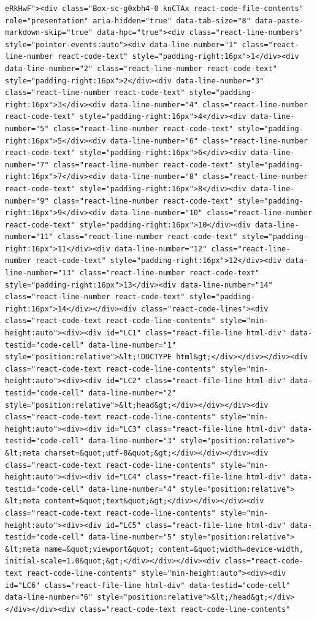 \documentclass[
  letterpaper,
]{book}
\begin{document}
\begin{verbatim}
eRkHwF"><div class="Box-sc-g0xbh4-0 knCTAx react-code-file-contents" role="presentation" aria-hidden="true" data-tab-size="8" data-paste-markdown-skip="true" data-hpc="true"><div class="react-line-numbers" style="pointer-events:auto"><div data-line-number="1" class="react-line-number react-code-text" style="padding-right:16px">1</div><div data-line-number="2" class="react-line-number react-code-text" style="padding-right:16px">2</div><div data-line-number="3" class="react-line-number react-code-text" style="padding-right:16px">3</div><div data-line-number="4" class="react-line-number react-code-text" style="padding-right:16px">4</div><div data-line-number="5" class="react-line-number react-code-text" style="padding-right:16px">5</div><div data-line-number="6" class="react-line-number react-code-text" style="padding-right:16px">6</div><div data-line-number="7" class="react-line-number react-code-text" style="padding-right:16px">7</div><div data-line-number="8" class="react-line-number react-code-text" style="padding-right:16px">8</div><div data-line-number="9" class="react-line-number react-code-text" style="padding-right:16px">9</div><div data-line-number="10" class="react-line-number react-code-text" style="padding-right:16px">10</div><div data-line-number="11" class="react-line-number react-code-text" style="padding-right:16px">11</div><div data-line-number="12" class="react-line-number react-code-text" style="padding-right:16px">12</div><div data-line-number="13" class="react-line-number react-code-text" style="padding-right:16px">13</div><div data-line-number="14" class="react-line-number react-code-text" style="padding-right:16px">14</div></div><div class="react-code-lines"><div class="react-code-text react-code-line-contents" style="min-height:auto"><div><div id="LC1" class="react-file-line html-div" data-testid="code-cell" data-line-number="1" style="position:relative">&lt;!DOCTYPE html&gt;</div></div></div><div class="react-code-text react-code-line-contents" style="min-height:auto"><div><div id="LC2" class="react-file-line html-div" data-testid="code-cell" data-line-number="2" style="position:relative">&lt;head&gt;</div></div></div><div class="react-code-text react-code-line-contents" style="min-height:auto"><div><div id="LC3" class="react-file-line html-div" data-testid="code-cell" data-line-number="3" style="position:relative">    &lt;meta charset=&quot;utf-8&quot;&gt;</div></div></div><div class="react-code-text react-code-line-contents" style="min-height:auto"><div><div id="LC4" class="react-file-line html-div" data-testid="code-cell" data-line-number="4" style="position:relative">    &lt;meta content=&quot;text&quot;&gt;</div></div></div><div class="react-code-text react-code-line-contents" style="min-height:auto"><div><div id="LC5" class="react-file-line html-div" data-testid="code-cell" data-line-number="5" style="position:relative">    &lt;meta name=&quot;viewport&quot; content=&quot;width=device-width, initial-scale=1.0&quot;&gt;</div></div></div><div class="react-code-text react-code-line-contents" style="min-height:auto"><div><div id="LC6" class="react-file-line html-div" data-testid="code-cell" data-line-number="6" style="position:relative">&lt;/head&gt;</div></div></div><div class="react-code-text react-code-line-contents" 
\end{verbatim}
\end{document}
